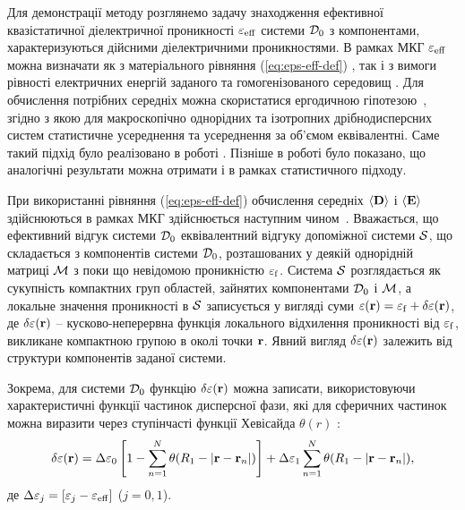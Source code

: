 \documentclass[14pt,twoside]{vakthesis}
\begin{document}
Для демонстрації методу розглянемо задачу знаходження  ефективної квазістатичної діелектричної проникності $\varepsilon_{\rm eff}$ системи ${\cal D}_0$ з компонентами, характеризуються дійсними діелектричними проникностями.
В рамках МКГ $\varepsilon_{\rm eff}$ можна визначати як з матеріального рівняння (\ref{eq:eps-eff-def}) \cite{Sushko2007}, так і з вимоги рівності електричних енергій заданого та гомогенізованого середовищ \cite{Sushko2017}. Для обчислення потрібних середніх можна  скористатися ергодичною гіпотезою~\cite{Torquato,LandauT8}, згідно з якою для макроскопічно однорідних та ізотропних дрібнодисперсних систем статистичне усереднення та усереднення за об'ємом еквівалентні. Саме такий підхід було реалізовано в роботі \cite{Sushko2007}. Пізніше в роботі \cite{Sushko2017} було показано, що аналогічні результати можна отримати і в рамках статистичного підходу.

При використанні рівняння (\ref{eq:eps-eff-def}) обчислення середніх $\langle{{\bf D}}\rangle$ і $\langle{{\bf E}}\rangle$ здійснюються в рамках МКГ здійснюється наступним чином~\cite{Sushko2017}.
Вважається, що ефективний відгук системи ${\cal D}_0$ еквівалентний відгуку допоміжної системи $\cal{S}$, що складається з компонентів системи ${\cal D}_0$, розташованих у деякій однорідній матриці $\cal{M}$ з поки що невідомою проникністю $\varepsilon_{\rm f}$. Система $\cal{S}$ розглядається як сукупність  компактних груп областей, зайнятих компонентами ${\cal D}_0$ і $\cal M$, а локальне значення проникності в $\cal{S}$ записується у вигляді суми $\varepsilon({\bf r}) = \varepsilon_{\rm f} + \delta\varepsilon({\bf r})$,
де $\delta\varepsilon({\bf r})$ -- кусково-неперервна функція локального відхилення проникності від $\varepsilon_{\rm f}$, викликане компактною групою в околі точки ${\bf r}$. Явний вигляд $\delta\varepsilon({\bf r})$ залежить від структури компонентів заданої системи.

Зокрема, для системи ${\cal D}_0$  функцію $\delta\varepsilon({\bf r})$ можна записати, використовуючи характеристичні функції частинок дисперсної фази, які для сферичних частинок  можна виразити через ступінчасті функції Хевісайда $\theta(r)$ \cite{Sushko2007, Sushko2009, Sushko2017}:
\begin{equation}\label{eq:delta-Brug-diel}
\delta{\varepsilon}({\bf r}) = \Delta{\varepsilon}_0 \left[ 1 - \sum\limits_{n=1}^N \theta(R_1 - |{\bf r} - {\bf r}_n|) \right] + \Delta{\varepsilon}_1\sum\limits_{n=1}^N \theta(R_1 - |{\bf r} - {\bf r}_n|),
\end{equation}
де $\Delta{\varepsilon}_j = [{\varepsilon}_j - {\varepsilon}_{\rm eff}]$ ($j = 0,1$).
\end{document}
